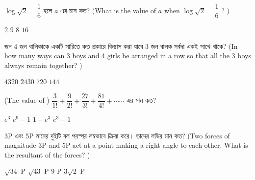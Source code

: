 \documentclass[addpoints]{exam}
\begin{document}
\begin{questions}
\question  $ \log \sqrt{2} = \dfrac{1}{6} $ হলে $ a $ এর মান কত? (What is the value of $ a $ when $ \log \sqrt{2} = \dfrac{1}{6} $ ? )


\begin{oneparchoices}
\choice  $ 2 $
\choice  $ 9 $
\choice  $ 8 $
\choice  $ 16 $
\end{oneparchoices}

 জন 4 জন বালিকাকে একটি সারিতে কত প্রকারে বিন্যাস করা যাবে 3 জন বালক সর্বদা একই সাথে থাকে? (In how many ways can 3 boys and 4 girls be arranged in a row so that all the 3 boys always remain together? )

\begin{oneparchoices}
\choice $ 4320 $
\choice $ 2430 $
\choice $ 720 $
\choice  $ 144 $
\end{oneparchoices}

 \question (The value of ) $ \dfrac{3}{1!}+\dfrac{9}{2!}+\dfrac{27}{3!}+\dfrac{81}{4!}+ \cdots \cdots $ এর মান কত?

\begin{oneparchoices}
\choice $ e^{3} $
\choice $ e^{9}-1 $
\choice $ 1-e^{3} $
\choice $ e^{3}-1 $
\end{oneparchoices}

\question  3P এবং 5P  মানের দুইটি বল পরস্পর লম্বভাবে ক্রিয়া করে। তাদের লদ্ধির মান কত? (Two forces of magnitude 3P and 5P act at a point making a right angle to each other. What is the resultant of the forces? )

\begin{oneparchoices}
\choice  $ \sqrt{34} $ P
\choice  $ \sqrt{43} $ P
\choice  $ 9 $ P
\choice  $ 3\sqrt{2} $ P
\end{oneparchoices}



\end{questions}
\end{document}
